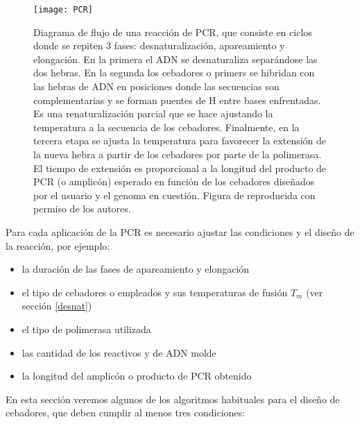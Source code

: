 \begin{figure}
\begin{center} 
\texttt{[image: PCR]}
\caption
{
Diagrama de flujo de una reacci\'{o}n de PCR, 
que consiste en ciclos donde se repiten 3 fases: desnaturalizaci\'{o}n, apareamiento y elongaci\'{o}n.
En la primera el ADN se desnaturaliza separ\'{a}ndose las dos hebras.
En la segunda los cebadores o primers se hibridan con las hebras de ADN en posiciones donde las 
secuencias son complementarias y se forman puentes de H entre bases enfrentadas. 
Es una renaturalizaci\'{o}n parcial que se hace ajustando la temperatura a la secuencia de los cebadores. 
Finalmente, en la tercera etapa se ajusta la temperatura para favorecer la extensi\'{o}n de la nueva hebra
a partir de los cebadores por parte de la polimerasa. 
El tiempo de extensi\'{o}n es proporcional a la longitud del producto de PCR (o amplic\'{o}n) esperado
en funci\'{o}n de los cebadores dise\~{n}ados por el usuario y el genoma en cuesti\'{o}n.
Figura de \cite{Konietzny2003} reproducida con permiso de los autores.
}
\label{fig:PCR}
\end{center}
\end{figure}

Para cada aplicaci\'{o}n de la PCR es necesario ajustar las condiciones y el dise\~no de la reacci\'{o}n,
por ejemplo:
\begin{itemize} 
\item la duraci\'{o}n de las fases de apareamiento y elongaci\'{o}n
\item el tipo de cebadores o  empleados y sus temperaturas de fusi\'{o}n $T_{m}$ (ver secci\'{o}n \ref{desnat})
\item el tipo de polimerasa utilizada
\item las cantidad de los reactivos y de ADN molde
\item la longitud del amplic\'{o}n o producto de PCR obtenido
\end{itemize}

En esta secci\'{o}n veremos algunos de los algoritmos habituales para el dise\~no de cebadores, 
que deben cumplir al menos tres condiciones: 


